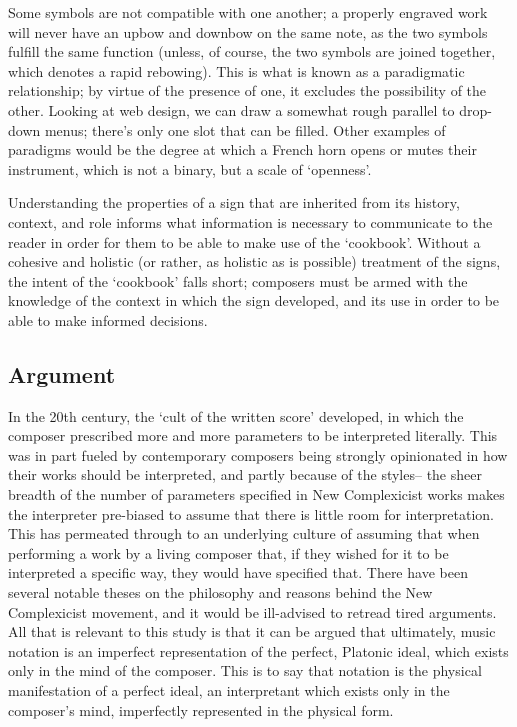 Some symbols are not compatible with one another; a properly engraved work will never have an upbow and downbow on the same note, as the two symbols fulfill the same function (unless, of course, the two symbols are joined together, which denotes a rapid rebowing).
This is what is known as a paradigmatic relationship; by virtue of the presence of one, it excludes the possibility of the other.
Looking at web design, we can draw a somewhat rough parallel to drop-down menus; there's only one slot that can be filled.
Other examples of paradigms would be the degree at which a French horn opens or mutes their instrument, which is not a binary, but a scale of `openness'.

Understanding the properties of a sign that are inherited from its history, context, and role informs what information is necessary to communicate to the reader in order for them to be able to make use of the `cookbook'.
Without a cohesive and holistic (or rather, as holistic as is possible) treatment of the signs, the intent of the `cookbook' falls short; composers must be armed with the knowledge of the context in which the sign developed, and its use in order to be able to make informed decisions.



\subsection{Argument}
In the 20th century, the `cult of the written score' developed, in which the composer prescribed more and more parameters to be interpreted literally.
This was in part fueled by contemporary composers being strongly opinionated in how their works should be interpreted, and partly because of the styles-- the sheer breadth of the number of parameters specified in New Complexicist works makes the interpreter pre-biased to assume that there is little room for interpretation.
This has permeated through to an underlying culture of assuming that when performing a work by a living composer that, if they wished for it to be interpreted a specific way, they would have specified that.
There have been several notable theses on the philosophy and reasons behind the New Complexicist movement, and it would be ill-advised to retread tired arguments.
All that is relevant to this study is that it can be argued that ultimately, music notation is an imperfect representation of the perfect, Platonic ideal, which exists only in the mind of the composer. 
This is to say that notation is the physical manifestation of a perfect ideal, an interpretant which exists only in the composer's mind, imperfectly represented in the physical form.

